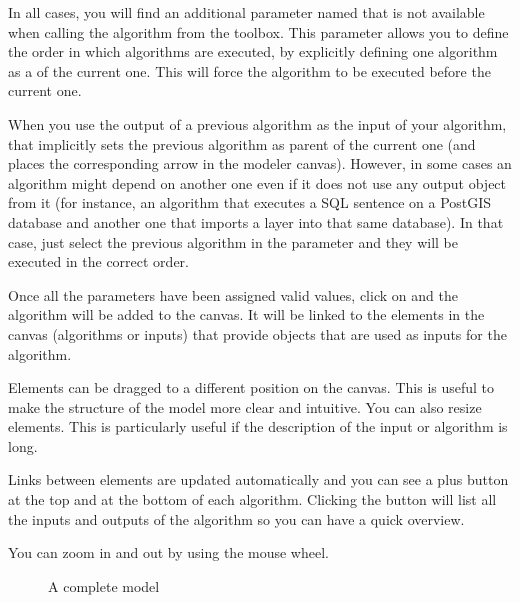 \documentclass[letterpaper,10pt,english]{sphinxmanual}
\begin{document}
\sphinxAtStartPar
In all cases, you will find an additional parameter named
 that is not available when calling the algorithm
from the toolbox.
This parameter allows you to define the order in which algorithms are
executed, by explicitly defining one algorithm as a  of the current
one.
This will force the  algorithm to be executed before the current one.

\sphinxAtStartPar
When you use the output of a previous algorithm as the input of your
algorithm, that implicitly sets the previous algorithm as parent of the
current one (and places the corresponding arrow in the modeler canvas).
However, in some cases an algorithm might depend on another one even if
it does not use any output object from it (for instance, an algorithm
that executes a SQL sentence on a PostGIS database and another one that
imports a layer into that same database).
In that case, just select the previous algorithm in the
 parameter and they will be executed in the correct
order.

\sphinxAtStartPar
Once all the parameters have been assigned valid values, click on
 and the algorithm will be added to the canvas.
It will be linked to the elements in the canvas (algorithms or inputs)
that provide objects that are used as inputs for the algorithm.

\sphinxAtStartPar
Elements can be dragged to a different position on the canvas.
This is useful to make the structure of the model more clear and
intuitive.
You can also resize elements.
This is particularly useful if the description of the input or algorithm is long.

\sphinxAtStartPar
Links between elements are updated automatically and you can see a plus button
at the top and at the bottom of each algorithm. Clicking the button will list
all the inputs and outputs of the algorithm so you can have a quick overview.

\sphinxAtStartPar
You can zoom in and out by using the mouse wheel.

\begin{figure}[H]
\centering
\capstart

\noindent{}
\caption{A complete model}\label{\detokenize{Introduction/models:id7}}\label{\detokenize{Introduction/models:figure-model-model}}\end{figure}
\end{document}
